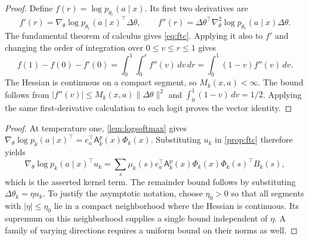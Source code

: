 \begin{proof}
Define $f(r)=\log p_{\theta_r}(a\mid x)$. Its first two derivatives are
\[
 f'(r)=\nabla_\theta\log p_{\theta_r}(a\mid x)^\top\Delta\theta,
 \qquad
 f''(r)=\Delta\theta^\top\nabla_\theta^2\log p_{\theta_r}(a\mid x)\Delta\theta.
\]
The fundamental theorem of calculus gives \cref{eq:ftc}. Applying it also to $f'$ and changing the order of integration over $0\le v\le r\le1$ gives
\[
 f(1)-f(0)-f'(0)=\int_0^1\int_0^r f''(v)\,dv\,dr
               =\int_0^1(1-v)f''(v)\,dv.
\]
The Hessian is continuous on a compact segment, so $M_k(x,a)<\infty$.
The bound follows from $|f''(v)|\le M_k(x,a)\|\Delta\theta\|^2$ and $\int_0^1(1-v)\,dv=1/2$.
Applying the same first-derivative calculation to each logit proves the vector identity.
\end{proof}

\begin{proof}
At temperature one, \cref{lem:logsoftmax} gives
$\nabla_\theta\log p_k(a\mid x)^\top=e_a^\top\mathsf A_k^p(x)\Phi_k(x)$.
Substituting $u_k$ in \cref{prop:ftc} therefore yields
\[
 \nabla_\theta\log p_k(a\mid x)^\top u_k
 =\sum_s\mu_k(s)e_a^\top\mathsf A_k^p(x)
        \Phi_k(x)\Phi_k(s)^\top B_k(s),
\]
which is the asserted kernel term. The remainder bound follows by substituting $\Delta\theta_k=\eta u_k$. To justify the asymptotic notation, choose $\eta_0>0$ so that all segments with $|\eta|\le\eta_0$ lie in a compact neighborhood where the Hessian is continuous. Its supremum on this neighborhood supplies a single bound independent of $\eta$. A family of varying directions requires a uniform bound on their norms as well.
\end{proof}

